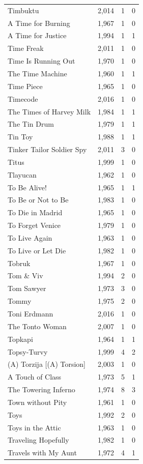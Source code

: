 \begin{tabular}{lrrr}
Timbuktu & 2,014 & 1 & 0 \\
A Time for Burning & 1,967 & 1 & 0 \\
A Time for Justice & 1,994 & 1 & 1 \\
Time Freak & 2,011 & 1 & 0 \\
Time Is Running Out & 1,970 & 1 & 0 \\
The Time Machine & 1,960 & 1 & 1 \\
Time Piece & 1,965 & 1 & 0 \\
Timecode & 2,016 & 1 & 0 \\
The Times of Harvey Milk & 1,984 & 1 & 1 \\
The Tin Drum & 1,979 & 1 & 1 \\
Tin Toy & 1,988 & 1 & 1 \\
Tinker Tailor Soldier Spy & 2,011 & 3 & 0 \\
Titus & 1,999 & 1 & 0 \\
Tlayucan & 1,962 & 1 & 0 \\
To Be Alive! & 1,965 & 1 & 1 \\
To Be or Not to Be & 1,983 & 1 & 0 \\
To Die in Madrid & 1,965 & 1 & 0 \\
To Forget Venice & 1,979 & 1 & 0 \\
To Live Again & 1,963 & 1 & 0 \\
To Live or Let Die & 1,982 & 1 & 0 \\
Tobruk & 1,967 & 1 & 0 \\
Tom \& Viv & 1,994 & 2 & 0 \\
Tom Sawyer & 1,973 & 3 & 0 \\
Tommy & 1,975 & 2 & 0 \\
Toni Erdmann & 2,016 & 1 & 0 \\
The Tonto Woman & 2,007 & 1 & 0 \\
Topkapi & 1,964 & 1 & 1 \\
Topsy-Turvy & 1,999 & 4 & 2 \\
(A) Torzija [(A) Torsion] & 2,003 & 1 & 0 \\
A Touch of Class & 1,973 & 5 & 1 \\
The Towering Inferno & 1,974 & 8 & 3 \\
Town without Pity & 1,961 & 1 & 0 \\
Toys & 1,992 & 2 & 0 \\
Toys in the Attic & 1,963 & 1 & 0 \\
Traveling Hopefully & 1,982 & 1 & 0 \\
Travels with My Aunt & 1,972 & 4 & 1 \\

\end{tabular}

